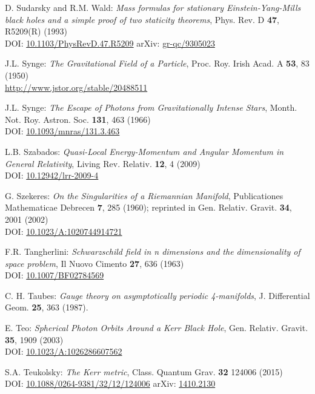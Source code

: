 \begin{thebibliography}{123}
D. Sudarsky and R.M. Wald:
{\em Mass formulas for stationary Einstein-Yang-Mills black holes and a simple proof of two staticity theorems},
Phys. Rev. D {\bf 47}, R5209(R) (1993)\\
DOI: \href{https://doi.org/10.1103/PhysRevD.47.R5209}{10.1103/PhysRevD.47.R5209}\hfill
arXiv: \href{https://arxiv.org/abs/gr-qc/9305023}{gr-qc/9305023}

J.L. Synge: {\em The Gravitational Field of a Particle},
Proc. Roy. Irish Acad. A {\bf 53}, 83 (1950)\\
\url{http://www.jstor.org/stable/20488511}

J.L. Synge: {\em The Escape of Photons from Gravitationally Intense Stars},
Month. Not. Roy. Astron. Soc. {\bf 131}, 463 (1966)\\
DOI: \href{https://doi.org/10.1093/mnras/131.3.463}{10.1093/mnras/131.3.463}

L.B. Szabados:
{\em Quasi-Local Energy-Momentum and Angular Momentum in General Relativity},
Living Rev. Relativ. {\bf 12}, 4 (2009)\\
DOI: \href{https://doi.org/10.12942/lrr-2009-4}{10.12942/lrr-2009-4}

G. Szekeres:
{\em On the Singularities of a Riemannian Manifold},
Publicationes Mathematicae Debrecen {\bf 7}, 285 (1960); reprinted in
Gen. Relativ. Gravit. {\bf 34}, 2001 (2002)\\
DOI: \href{https://doi.org/10.1023/A:1020744914721}{10.1023/A:1020744914721}

F.R. Tangherlini:
{\em Schwarzschild field in n dimensions and the dimensionality of space problem},
Il Nuovo Cimento {\bf 27}, 636 (1963)\\
DOI: \href{https://doi.org/10.1007/BF02784569}{10.1007/BF02784569}

C. H. Taubes:
{\em Gauge theory on asymptotically periodic 4-manifolds},
J. Differential Geom. {\bf 25}, 363 (1987).

E. Teo:
{\em Spherical Photon Orbits Around a Kerr Black Hole},
Gen. Relativ. Gravit. {\bf 35}, 1909 (2003)\\
DOI: \href{https://doi.org/10.1023/A:1026286607562}{10.1023/A:1026286607562}

S.A. Teukolsky:
{\em The Kerr metric},
Class. Quantum Grav. {\bf 32} 124006 (2015)\\
DOI: \href{https://doi.org/10.1088/0264-9381/32/12/124006}{10.1088/0264-9381/32/12/124006}\hfill
arXiv: \href{https://arxiv.org/abs/1410.2130}{1410.2130}


\end{thebibliography}
